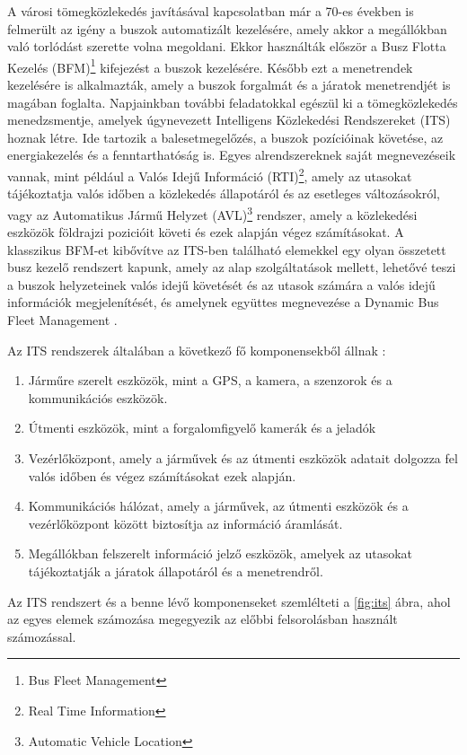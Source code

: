 A városi tömegközlekedés javításával kapcsolatban már a 70-es években is felmerült az igény a buszok automatizált kezelésére, amely akkor a megállókban való torlódást szerette volna megoldani. Ekkor használták először a Busz Flotta Kezelés (BFM)\footnote{Bus Fleet Management} kifejezést a buszok kezelésére. Később ezt a menetrendek kezelésére is alkalmazták, amely a buszok forgalmát és a járatok menetrendjét is magában foglalta. Napjainkban további feladatokkal egészül ki a tömegközlekedés menedzsmentje, amelyek úgynevezett Intelligens Közlekedési Rendszereket (ITS) hoznak létre. Ide tartozik a balesetmegelőzés, a buszok pozícióinak követése, az energiakezelés és a fenntarthatóság is. Egyes alrendszereknek saját megnevezéseik vannak, mint például a Valós Idejű Információ (RTI)\footnote{Real Time Information}, amely az utasokat tájékoztatja valós időben a közlekedés állapotáról és az esetleges változásokról, vagy az Automatikus Jármű Helyzet (AVL)\footnote{Automatic Vehicle Location} rendszer, amely a közlekedési eszközök földrajzi pozicióit követi és ezek alapján végez számításokat. A klasszikus BFM-et kibővítve az ITS-ben található elemekkel egy olyan összetett busz kezelő rendszert kapunk, amely az alap szolgáltatások mellett, lehetővé teszi a buszok helyzeteinek valós idejű követését és az utasok számára a valós idejű információk megjelenítését, és amelynek együttes megnevezése a Dynamic Bus Fleet Management \cite{orovsnjak2020bus,polyviou2011modelling}.

Az ITS rendszerek általában a következő fő komponensekből állnak \cite{polyviou2011modelling}:
\begin{enumerate}
  \item Járműre szerelt eszközök, mint a GPS, a kamera, a szenzorok és a kommunikációs eszközök.
  \item Útmenti eszközök, mint a forgalomfigyelő kamerák és a jeladók
  \item Vezérlőközpont, amely a járművek és az útmenti eszközök adatait dolgozza fel valós időben és végez számításokat ezek alapján.
  \item Kommunikációs hálózat, amely a járművek, az útmenti eszközök és a vezérlőközpont között biztosítja az információ áramlását.
  \item Megállókban felszerelt információ jelző eszközök, amelyek az utasokat tájékoztatják a járatok állapotáról és a menetrendről.
\end{enumerate}

Az ITS rendszert és a benne lévő komponenseket szemlélteti a \ref{fig:its} ábra, ahol az egyes elemek számozása megegyezik az előbbi felsorolásban használt számozással.

